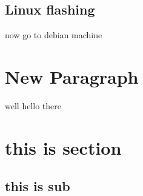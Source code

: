 \documentclass[a4paper,12pt]{article}
\begin{document}
\subsection{Linux flashing}
now go to debian machine
\newpage
\section{New Paragraph}
well hello there
\pagebreak
\section{this is section}
\subsection{this is sub}
\end{document}
